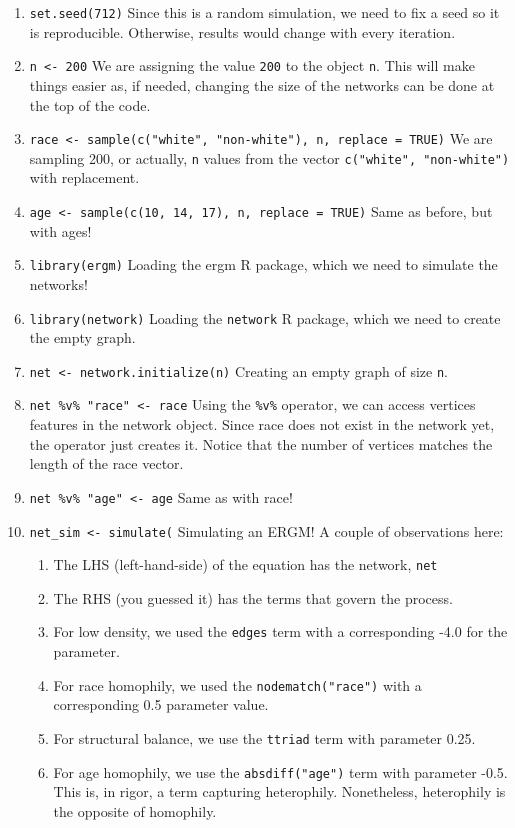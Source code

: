 \documentclass[]{book}
\begin{document}
\begin{enumerate}
\def\labelenumi{\arabic{enumi}.}
\item
  \texttt{set.seed(712)} Since this is a random simulation, we need to fix a seed so it is reproducible. Otherwise, results would change with every iteration.
\item
  \texttt{n\ \textless{}-\ 200} We are assigning the value \texttt{200} to the object \texttt{n}. This will make things easier as, if needed, changing the size of the networks can be done at the top of the code.
\item
  \texttt{race\ \textless{}-\ sample(c("white",\ "non-white"),\ n,\ replace\ =\ TRUE)} We are sampling 200, or actually, \texttt{n} values from the vector \texttt{c("white",\ "non-white")} with replacement.
\item
  \texttt{age\ \textless{}-\ sample(c(10,\ 14,\ 17),\ n,\ replace\ =\ TRUE)} Same as before, but with ages!
\item
  \texttt{library(ergm)} Loading the ergm R package, which we need to simulate the networks!
\item
  \texttt{library(network)} Loading the \texttt{network} R package, which we need to create the empty graph.
\item
  \texttt{net\ \textless{}-\ network.initialize(n)} Creating an empty graph of size \texttt{n}.
\item
  \texttt{net\ \%v\%\ "race"\ \textless{}-\ race} Using the \texttt{\%v\%} operator, we can access vertices features in the network object. Since race does not exist in the network yet, the operator just creates it. Notice that the number of vertices matches the length of the race vector.
\item
  \texttt{net\ \%v\%\ "age"\ \textless{}-\ age} Same as with race!
\item
  \texttt{net\_sim\ \textless{}-\ simulate(} Simulating an ERGM! A couple of observations here:

  \begin{enumerate}
  \def\labelenumii{\alph{enumii}.}
  \item
    The LHS (left-hand-side) of the equation has the network, \texttt{net}
  \item
    The RHS (you guessed it) has the terms that govern the process.
  \item
    For low density, we used the \texttt{edges} term with a corresponding
    -4.0 for the parameter.
  \item
    For race homophily, we used the \texttt{nodematch("race")} with a
    corresponding 0.5 parameter value.
  \item
    For structural balance, we use the \texttt{ttriad} term with parameter
    0.25.
  \item
    For age homophily, we use the \texttt{absdiff("age")} term with parameter
    -0.5. This is, in rigor, a term capturing heterophily. Nonetheless,
    heterophily is the opposite of homophily.
  \end{enumerate}
\end{enumerate}
\end{document}
